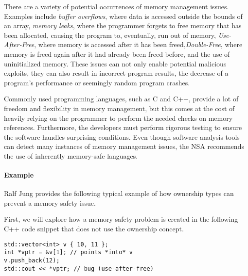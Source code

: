 \documentclass[sigplan,11pt,nonacm]{acmart}
\begin{document}
There are a variety of potential occurrences of memory management issues.
Examples include \emph{buffer overflows}, where data is accessed outside the bounds of an array, \emph{memory leaks}, where the programmer forgets to free memory that has been allocated, causing the program to, eventually, run out of memory, \emph{Use-After-Free}, where memory is accessed after it has been freed,\emph{Double-Free}, where memory is freed again after it had already been freed before, and the use of uninitialized memory.
These issues can not only enable potential malicious exploits, they can also result in incorrect program results, the decrease of a program's performance or seemingly random program crashes.

Commonly used programming languages, such as C and C++, provide a lot of freedom and flexibility in memory management, but this comes at the cost of heavily relying on the programmer to perform the needed checks on memory references.
Furthermore, the developers must perform rigorous testing to ensure the software handles surprising conditions.
Even though software analysis tools can detect many instances of memory management issues, the NSA recommends the use of inherently memory-safe languages.

\paragraph{Example}

Ralf Jung \cite{understanding-evolving-rust} provides the following typical example of how ownership types can prevent a memory safety issue.

First, we will explore how a memory safety problem is created in the following C++ code snippet that does not use the ownership concept.

\begin{lstlisting}
std::vector<int> v { 10, 11 };
int *vptr = &v[1]; // points *into* v
v.push_back(12);
std::cout << *vptr; // bug (use-after-free)
\end{lstlisting}
\end{document}
